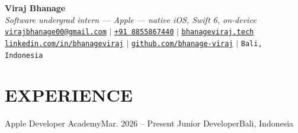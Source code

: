 


\begin{center}
    \textbf{\Huge Viraj Bhanage} \\ \vspace{4pt}
    {\small\textit{Software undergrad intern --- Apple --- native iOS, Swift 6, on-device}} \\ \vspace{4pt}
    \small
    \faEnvelope \hspace{2pt} \href{mailto:virajbhanage00@gmail.com}{\texttt{virajbhanage00@gmail.com}} \hspace{1pt} $|$
    \hspace{1pt} \faPhone \hspace{2pt} \href{tel:+918855867440}{\texttt{+91 8855867440}} \hspace{1pt} $|$
    \hspace{1pt} \href{https://www.bhanageviraj.tech}{\texttt{bhanageviraj.tech}} \\
    \faLinkedin \hspace{2pt} \href{https://www.linkedin.com/in/bhanageviraj/}{\texttt{linkedin.com/in/bhanageviraj}} \hspace{1pt} $|$
    \hspace{1pt} \faGithub \hspace{2pt} \href{https://github.com/bhanage-viraj}{\texttt{github.com/bhanage-viraj}} \hspace{1pt} $|$
    \hspace{1pt} \faMapMarker* \hspace{2pt}\texttt{Bali, Indonesia}
\end{center}

\section{EXPERIENCE}
  \resumeSubHeadingListStart
    \resumeSubheading
      {Apple Developer Academy}{Mar. 2026 -- Present}
      {Junior Developer}{Bali, Indonesia}
      \resumeItemListStart
      \resumeItemListEnd
  \resumeSubHeadingListEnd

